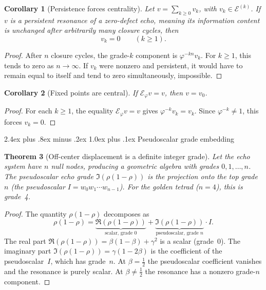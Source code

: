 \documentclass[11pt,a4paper]{article}
\makeatletter
\theoremstyle{plain}
\newtheorem{theorem}{Theorem}[section]
\newtheorem{corollary}[theorem]{Corollary}
\theoremstyle{definition}
\theoremstyle{remark}
\numberwithin{equation}{section}
\newcommand{\vp}{\varphi}
\newcommand{\EF}{\mathcal{E}}
\renewcommand{\subsection}{%
  \@startsection{subsection}{2}{0pt}%
    {2.4ex plus .8ex minus .2ex}%
    {1.0ex plus .1ex}%
    {\normalfont\Large\bfseries\color{headingAccent}}%
}
\makeatother
\begin{document}
\begin{corollary}[Persistence forces centrality]
\label{cor:persistence-centrality}
Let \(v=\sum_{k\ge0}v_k\), with \(v_k\in\EF^{(k)}\).  If \(v\) is a
persistent resonance of a zero-defect echo, meaning its information
content is unchanged after arbitrarily many closure cycles, then
\[
  v_k=0\qquad(k\ge1).
\]
\end{corollary}

\begin{proof}
After \(n\) closure cycles, the grade-\(k\) component is
\(\vp^{-kn}v_k\).  For \(k\ge1\), this tends to zero as
\(n\to\infty\).  If \(v_k\) were nonzero and persistent, it would have
to remain equal to itself and tend to zero simultaneously, impossible.
\end{proof}

\begin{corollary}[Fixed points are central]
\label{cor:fixed-central}
If \(\mathcal E_\vp v=v\), then \(v=v_0\).
\end{corollary}

\begin{proof}
For each \(k\ge1\), the equality \(\mathcal E_\vp v=v\) gives
\(\vp^{-k}v_k=v_k\).  Since \(\vp^{-k}\ne1\), this forces
\(v_k=0\).
\end{proof}

\subsection{Pseudoscalar grade embedding}

\begin{theorem}[Off-center displacement is a definite integer grade]
\label{thm:grade-embedding}
Let the echo system have \(n\) null nodes, producing a geometric
algebra with grades \(0,1,\ldots,n\).  The pseudoscalar echo grade
\(\Im(\rho(1-\rho))\) is the projection onto the top grade~\(n\)
(the pseudoscalar \(I=w_0w_1\cdots w_{n-1}\)).  For the golden
tetrad (\(n=4\)), this is grade~4.
\end{theorem}

\begin{proof}
The quantity \(\rho(1-\rho)\) decomposes as
\[
  \rho(1-\rho)=\underbrace{\Re(\rho(1-\rho))}_{\text{scalar, grade }0}
  +\underbrace{\Im(\rho(1-\rho))}_{\text{pseudoscalar, grade }n}\cdot I.
\]
The real part
\(\Re(\rho(1-\rho))=\beta(1-\beta)+\gamma^2\) is a scalar
(grade~0).  The imaginary part \(\Im(\rho(1-\rho))=\gamma(1-2\beta)\) is
the coefficient of the pseudoscalar~\(I\), which has grade~\(n\).  At
\(\beta=\tfrac12\) the pseudoscalar coefficient vanishes and the
resonance is purely scalar.  At \(\beta\ne\tfrac12\) the resonance has a
nonzero grade-\(n\) component.
\end{proof}
\end{document}
